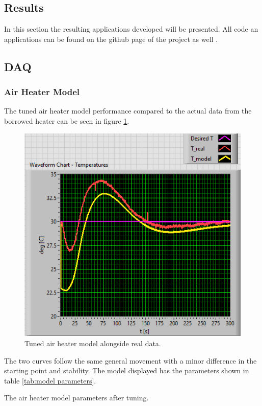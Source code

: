 \documentclass[11pt, A4paper, english]{article}
\numberwithin{equation}{section}
\begin{document}
\begin{multicols}{2}
		\section{Results}
In this section the resulting applications developed will be presented. All code an applications can be found on the github page of the project as well \cite{github}. 
			
			\subsection{DAQ}
				\subsubsection{Air Heater Model}
The tuned air heater model performance compared to the actual data from the borrowed heater can be seen in figure \ref{fig:tuned}.
				\begin{figure}[H]
\includegraphics[width=\columnwidth]{Tuned model with filter data.png}
\caption{Tuned air heater model alongside real data.}
\label{fig:tuned}
				\end{figure}
The two curves follow the same general movement with a minor difference in the starting point and stability. The model displayed has the parameters shown in table \ref{tab:model parameters}.
				\begin{table}[H]
\caption{The air heater model parameters after tuning.}

\end{table}
\end{multicols}
\end{document}
